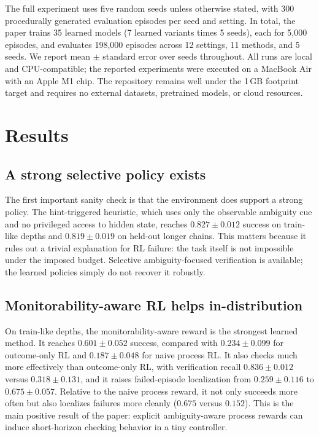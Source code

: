 \documentclass{article}
\begin{document}
The full experiment uses five random seeds unless otherwise stated, with 300 procedurally generated evaluation episodes per seed and setting. In total, the paper trains 35 learned models (7 learned variants times 5 seeds), each for 5{,}000 episodes, and evaluates 198{,}000 episodes across 12 settings, 11 methods, and 5 seeds. We report mean $\pm$ standard error over seeds throughout. All runs are local and CPU-compatible; the reported experiments were executed on a MacBook Air with an Apple M1 chip. The repository remains well under the 1\,GB footprint target and requires no external datasets, pretrained models, or cloud resources.

\section{Results}
\subsection{A strong selective policy exists}
The first important sanity check is that the environment does support a strong policy. The hint-triggered heuristic, which uses only the observable ambiguity cue and no privileged access to hidden state, reaches $0.827 \pm 0.012$ success on train-like depths and $0.819 \pm 0.019$ on held-out longer chains. This matters because it rules out a trivial explanation for RL failure: the task itself is not impossible under the imposed budget. Selective ambiguity-focused verification is available; the learned policies simply do not recover it robustly.

\subsection{Monitorability-aware RL helps in-distribution}
On train-like depths, the monitorability-aware reward is the strongest learned method. It reaches $0.601 \pm 0.052$ success, compared with $0.234 \pm 0.099$ for outcome-only RL and $0.187 \pm 0.048$ for naive process RL. It also checks much more effectively than outcome-only RL, with verification recall $0.836 \pm 0.012$ versus $0.318 \pm 0.131$, and it raises failed-episode localization from $0.259 \pm 0.116$ to $0.675 \pm 0.057$. Relative to the naive process reward, it not only succeeds more often but also localizes failures more cleanly ($0.675$ versus $0.152$). This is the main positive result of the paper: explicit ambiguity-aware process rewards can induce short-horizon checking behavior in a tiny controller.
\end{document}
